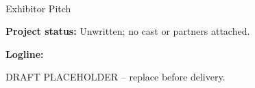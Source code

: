 \documentclass[11pt,letterpaper]{article}
\begin{document}
\begin{center}
{\Large\bfseries\sffamily \filmtitleupper}\\[6pt]
Exhibitor Pitch
\end{center}
\textbf{Project status:} Unwritten; no cast or partners attached.

\textbf{Logline:} \filmlogline

DRAFT PLACEHOLDER -- replace before delivery.
\end{document}
